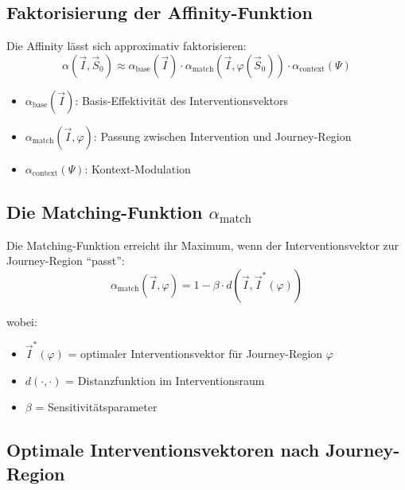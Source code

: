 \subsection{Faktorisierung der Affinity-Funktion}

Die Affinity lässt sich approximativ faktorisieren:
\begin{equation}
\alpha(\vec{I}, \vec{S}_0) \approx \alpha_{\text{base}}(\vec{I}) \cdot \alpha_{\text{match}}(\vec{I}, \varphi(\vec{S}_0)) \cdot \alpha_{\text{context}}(\Psi)
\label{eq:18-affinity-factorization}
\end{equation}

\begin{itemize}[nosep]
\item $\alpha_{\text{base}}(\vec{I})$: Basis-Effektivität des Interventionsvektors
\item $\alpha_{\text{match}}(\vec{I}, \varphi)$: Passung zwischen Intervention und Journey-Region
\item $\alpha_{\text{context}}(\Psi)$: Kontext-Modulation
\end{itemize}

\subsection{Die Matching-Funktion $\alpha_{\text{match}}$}

\begin{tcolorbox}[colback=green!5!white, colframe=green!75!black,
    title=\textbf{Theorem: Optimales Matching}]

Die Matching-Funktion erreicht ihr Maximum, wenn der Interventionsvektor zur Journey-Region ``passt'':
\begin{equation}
\alpha_{\text{match}}(\vec{I}, \varphi) = 1 - \beta \cdot d(\vec{I}, \vec{I}^*(\varphi))
\label{eq:18-matching}
\end{equation}

wobei:
\begin{itemize}[nosep]
\item $\vec{I}^*(\varphi)$ = optimaler Interventionsvektor für Journey-Region $\varphi$
\item $d(\cdot, \cdot)$ = Distanzfunktion im Interventionsraum
\item $\beta$ = Sensitivitätsparameter
\end{itemize}

\end{tcolorbox}

\subsection{Optimale Interventionsvektoren nach Journey-Region}


